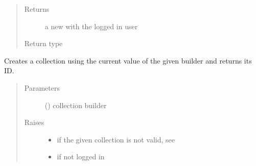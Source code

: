 \documentclass[letterpaper,10pt,english]{sphinxmanual}
\begin{document}
\begin{fulllineitems}
\begin{fulllineitems}
\begin{quote}
\begin{description}
\item[{Returns}] \leavevmode
a new {\hyperref[\detokenize{autoapi/pine/client/models/index:pine.client.models.CollectionBuilder}]{}} with the logged in user

\item[{Return type}] \leavevmode
{\hyperref[\detokenize{autoapi/pine/client/models/index:pine.client.models.CollectionBuilder}]{}}

\end{description}\end{quote}

\end{fulllineitems}


\begin{fulllineitems}
\label{\detokenize{autoapi/pine/client/client/index:pine.client.client.PineClient.create_collection}}
Creates a collection using the current value of the given builder and returns its ID.
\begin{quote}\begin{description}
\item[{Parameters}] \leavevmode
{} ({\hyperref[\detokenize{autoapi/pine/client/models/index:pine.client.models.CollectionBuilder}]{}}) \textendash{} collection builder

\item[{Raises}] \leavevmode\begin{itemize}
\item {} 
{\hyperref[\detokenize{autoapi/pine/client/exceptions/index:pine.client.exceptions.PineClientValueException}]{}} \textendash{} if the given collection is not valid, see {\hyperref[\detokenize{autoapi/pine/client/models/index:pine.client.models.is_valid_collection}]{}}

\item {} 
{\hyperref[\detokenize{autoapi/pine/client/exceptions/index:pine.client.exceptions.PineClientAuthException}]{}} \textendash{} if not logged in


\end{itemize}
\end{description}
\end{quote}
\end{fulllineitems}
\end{fulllineitems}
\end{document}
